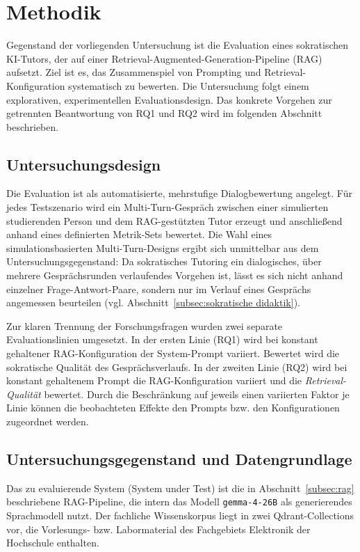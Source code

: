 \section{Methodik}
\label{sec:methodik}

Gegenstand der vorliegenden Untersuchung ist die Evaluation eines sokratischen
KI-Tutors, der auf einer Retrieval-Augmented-Generation-Pipeline (RAG) aufsetzt.
Ziel ist es, das Zusammenspiel von Prompting und Retrieval-Konfiguration systematisch
zu bewerten. Die Untersuchung folgt einem explorativen, experimentellen
Evaluationsdesign. Das konkrete Vorgehen zur getrennten Beantwortung von RQ1 und RQ2
wird im folgenden Abschnitt beschrieben.

\subsection{Untersuchungsdesign}
\label{subsec:design}

Die Evaluation ist als automatisierte, mehrstufige Dialogbewertung angelegt. Für jedes
Testszenario wird ein Multi-Turn-Gespräch zwischen einer simulierten studierenden
Person und dem RAG-gestützten Tutor erzeugt und anschließend anhand eines definierten
Metrik-Sets bewertet. Die Wahl eines simulationsbasierten Multi-Turn-Designs ergibt
sich unmittelbar aus dem Untersuchungsgegenstand: Da sokratisches Tutoring ein
dialogisches, über mehrere Gesprächsrunden verlaufendes Vorgehen ist, lässt es sich
nicht anhand einzelner Frage-Antwort-Paare, sondern nur im Verlauf eines Gesprächs
angemessen beurteilen  (vgl. Abschnitt~\ref{subsec:sokratische didaktik}).

Zur klaren Trennung der Forschungsfragen wurden zwei separate Evaluationslinien
umgesetzt. In der ersten Linie (RQ1) wird bei konstant gehaltener RAG-Konfiguration
der System-Prompt variiert. Bewertet wird die sokratische Qualität des Gesprächsverlaufs. In der zweiten Linie (RQ2) wird bei konstant gehaltenem Prompt die
RAG-Konfiguration variiert und die \emph{Retrieval-Qualität} bewertet. Durch die
Beschränkung auf jeweils einen variierten Faktor je Linie können die beobachteten
Effekte den Prompts bzw. den Konfigurationen zugeordnet werden.

\subsection{Untersuchungsgegenstand und Datengrundlage}
\label{subsec:gegenstand}

Das zu evaluierende System (System under Test) ist die in Abschnitt~\ref{subsec:rag} beschriebene RAG-Pipeline, die intern das Modell
\texttt{gemma-4-26B} als generierendes Sprachmodell nutzt. Der fachliche
Wissenskorpus liegt in zwei Qdrant-Collections vor, die Vorlesungs- bzw.
Labormaterial des Fachgebiets Elektronik der Hochschule enthalten.

